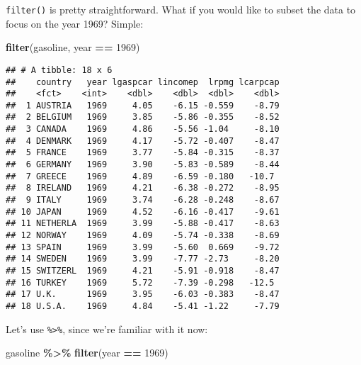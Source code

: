 \documentclass[
]{article}
\newenvironment{Shaded}{\begin{snugshade}}{\end{snugshade}}
\newcommand{\DecValTok}[1]{\textcolor[rgb]{0.00,0.00,0.81}{#1}}
\newcommand{\KeywordTok}[1]{\textcolor[rgb]{0.13,0.29,0.53}{\textbf{#1}}}
\newcommand{\NormalTok}[1]{#1}
\newcommand{\OperatorTok}[1]{\textcolor[rgb]{0.81,0.36,0.00}{\textbf{#1}}}
\newcommand{\StringTok}[1]{\textcolor[rgb]{0.31,0.60,0.02}{#1}}
\begin{document}
\texttt{filter()} is pretty straightforward. What if you would like to subset the data to focus on the
year 1969? Simple:

\begin{Shaded}
\begin{Highlighting}[]
\KeywordTok{filter}\NormalTok{(gasoline, year }\OperatorTok{==}\StringTok{ }\DecValTok{1969}\NormalTok{)}
\end{Highlighting}
\end{Shaded}

\begin{verbatim}
## # A tibble: 18 x 6
##    country   year lgaspcar lincomep  lrpmg lcarpcap
##    <fct>    <int>    <dbl>    <dbl>  <dbl>    <dbl>
##  1 AUSTRIA   1969     4.05    -6.15 -0.559    -8.79
##  2 BELGIUM   1969     3.85    -5.86 -0.355    -8.52
##  3 CANADA    1969     4.86    -5.56 -1.04     -8.10
##  4 DENMARK   1969     4.17    -5.72 -0.407    -8.47
##  5 FRANCE    1969     3.77    -5.84 -0.315    -8.37
##  6 GERMANY   1969     3.90    -5.83 -0.589    -8.44
##  7 GREECE    1969     4.89    -6.59 -0.180   -10.7 
##  8 IRELAND   1969     4.21    -6.38 -0.272    -8.95
##  9 ITALY     1969     3.74    -6.28 -0.248    -8.67
## 10 JAPAN     1969     4.52    -6.16 -0.417    -9.61
## 11 NETHERLA  1969     3.99    -5.88 -0.417    -8.63
## 12 NORWAY    1969     4.09    -5.74 -0.338    -8.69
## 13 SPAIN     1969     3.99    -5.60  0.669    -9.72
## 14 SWEDEN    1969     3.99    -7.77 -2.73     -8.20
## 15 SWITZERL  1969     4.21    -5.91 -0.918    -8.47
## 16 TURKEY    1969     5.72    -7.39 -0.298   -12.5 
## 17 U.K.      1969     3.95    -6.03 -0.383    -8.47
## 18 U.S.A.    1969     4.84    -5.41 -1.22     -7.79
\end{verbatim}

Let's use \texttt{\%\textgreater{}\%}, since we're familiar with it now:

\begin{Shaded}
\begin{Highlighting}[]
\NormalTok{gasoline }\OperatorTok{\%\textgreater{}\%}\StringTok{ }\KeywordTok{filter}\NormalTok{(year }\OperatorTok{==}\StringTok{ }\DecValTok{1969}\NormalTok{)}
\end{Highlighting}
\end{Shaded}
\end{document}
